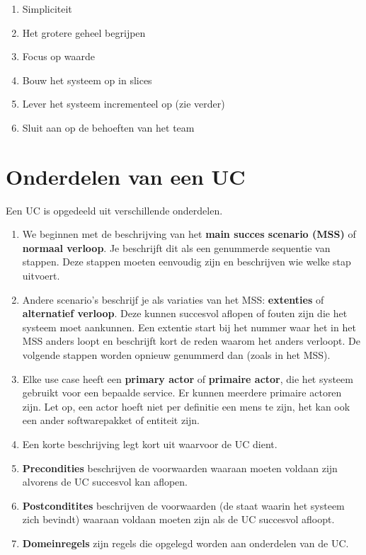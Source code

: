\begin{enumerate}
	\item Simpliciteit
	\item Het grotere geheel begrijpen
	\item Focus op waarde
	\item Bouw het systeem op in slices
	\item Lever het systeem incrementeel op (zie verder)
	\item Sluit aan op de behoeften van het team
\end{enumerate}

\section{Onderdelen van een UC}

Een UC is opgedeeld uit verschillende onderdelen. 
\begin{enumerate}
	\item We beginnen met de beschrijving van het \textbf{main succes scenario (MSS)} of \textbf{normaal verloop}. Je beschrijft dit als een genummerde sequentie van stappen. Deze stappen moeten eenvoudig zijn en beschrijven wie welke stap uitvoert. 
	\item Andere scenario's beschrijf je als variaties van het MSS: \textbf{extenties} of \textbf{alternatief verloop}. Deze kunnen succesvol aflopen of fouten zijn die het systeem moet aankunnen. Een extentie start bij het nummer waar het in het MSS anders loopt en beschrijft kort de reden waarom het anders verloopt. De volgende stappen worden opnieuw genummerd dan (zoals in het MSS). 
	\item Elke use case heeft een \textbf{primary actor} of \textbf{primaire actor}, die het systeem gebruikt voor een bepaalde service. Er kunnen meerdere primaire actoren zijn. Let op, een actor hoeft niet per definitie een mens te zijn, het kan ook een ander softwarepakket of entiteit zijn.
	\item Een korte beschrijving legt kort uit waarvoor de UC dient.
	\item \textbf{Precondities} beschrijven de voorwaarden waaraan moeten voldaan zijn alvorens de UC succesvol kan aflopen.
	\item \textbf{Postconditites} beschrijven de voorwaarden (de staat waarin het systeem zich bevindt) waaraan voldaan moeten zijn als de UC succesvol afloopt. 
	\item \textbf{Domeinregels} zijn  regels die opgelegd worden aan onderdelen van de UC. 
\end{enumerate}

